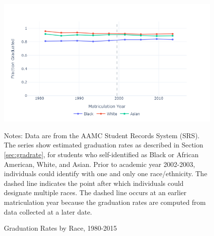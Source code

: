\documentclass[12pt]{article}
\begin{document}
  \begin{figure}[hp]
    \centering
    \caption{Graduation Rates by Race, 1980-2015}
    \label{fig:graduation}
    \includegraphics[width=\textwidth]{figs/gradrate_byrace.png}
    \begin{minipage}{0.9\textwidth}
    \footnotesize Notes: Data are from the AAMC Student Records System (SRS). The series show estimated graduation rates as described in Section \ref{sec:gradrate}, for students who self-identified as Black or African American, White, and Asian. Prior to academic year 2002-2003, individuals could identify with one and only one race/ethnicity. The dashed line indicates the point after which individuals could designate multiple races. The dashed line occurs at an earlier matriculation year because the graduation rates are computed from data collected at a later date. 
    \end{minipage}
   \end{figure}
 
\end{document}
